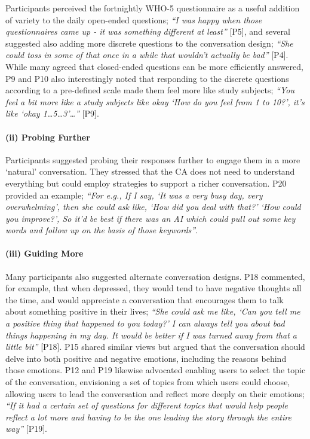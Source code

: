                 Participants perceived the fortnightly \ac{WHO-5} questionnaire as a useful addition of variety to the daily open-ended questions; \textit{``I was happy when those questionnaires came up - it was something different at least''} [P5], and several suggested also adding more discrete questions to the conversation design; \textit{``She could toss in some of that once in a while that wouldn't actually be bad''} [P4]. While many agreed that closed-ended questions can be more efficiently answered, P9 and P10 also interestingly noted that responding to the discrete questions according to a pre-defined scale made them feel more like study subjects; \textit{``You feel a bit more like a study subjects like okay `How do you feel from 1 to 10?', it's like `okay 1\ldots 5\ldots 3'\ldots''} [P9]. 
                
            \paragraph{(ii) Probing Further}
                
                Participants suggested probing their responses further to engage them in a more `natural' conversation. They stressed that the \ac{CA} does not need to understand everything but could employ strategies to support a richer conversation. P20 provided an example; \textit{``For e.g., If I say, `It was a very busy day, very overwhelming', then she could ask like, `How did you deal with that?' `How could you improve?', So it’d be best if there was an \ac{AI} which could pull out some key words and follow up on the basis of those keywords''}.

            \paragraph{(iii) Guiding More}
            
                Many participants also suggested alternate conversation designs. P18 commented, for example, that when depressed, they would tend to have negative thoughts all the time, and would appreciate a conversation that encourages them to talk about something positive in their lives; \textit{``She could ask me like, `Can you tell me a positive thing that happened to you today?' I can always tell you about bad things happening in my day. It would be better if I was turned away from that a little bit''} [P18]. P15 shared similar views but argued that the conversation should delve into both positive and negative emotions, including the reasons behind those emotions. P12 and P19 likewise advocated enabling users to select the topic of the conversation, envisioning a set of topics from which users could choose, allowing users to lead the conversation and reflect more deeply on their emotions; \textit{``If it had a certain set of questions for different topics that would help people reflect a lot more and having to be the one leading the story through the entire way''} [P19].

